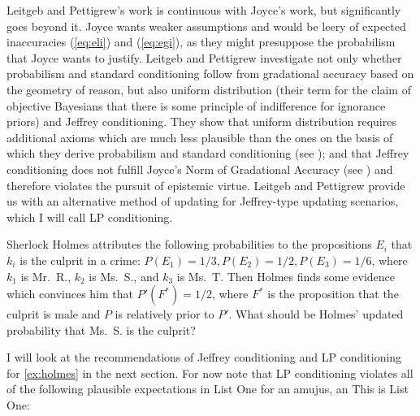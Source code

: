 \documentclass[phd,12pt,oneside]{ubcthesis}
\begin{document}
Leitgeb and Pettigrew's work is continuous with Joyce's work, but
significantly goes beyond it. Joyce wants weaker assumptions and would
be leery of expected inaccuracies (\ref{eq:eli}) and (\ref{eq:egi}),
as they might presuppose the probabilism that Joyce wants to justify.
Leitgeb and Pettigrew investigate not only whether probabilism and
standard conditioning follow from gradational accuracy based on the
geometry of reason, but also uniform distribution (their term for the
claim of objective Bayesians that there is some principle of
indifference for ignorance priors) and Jeffrey conditioning. They show
that uniform distribution requires additional axioms which are much
less plausible than the ones on the basis of which they derive
probabilism and standard conditioning (see
); and that Jeffrey conditioning
does not fulfill Joyce's Norm of Gradational Accuracy (see
) and therefore violates the pursuit of
epistemic virtue. Leitgeb and Pettigrew provide us with an alternative
method of updating for Jeffrey-type updating scenarios, which I will
call LP conditioning.

\begin{quotex}
  \label{ex:holmes} Sherlock Holmes
  attributes the following probabilities to the propositions $E_{i}$
  that $k_{i}$ is the culprit in a crime:
  $P(E_{1})=1/3,P(E_{2})=1/2,P(E_{3})=1/6$, where $k_{1}$ is Mr.\ R.,
  $k_{2}$ is Ms.\ S., and $k_{3}$ is Ms.\ T. Then Holmes finds some
  evidence which convinces him that $P'(F^{*})=1/2$, where $F^{*}$ is
  the proposition that the culprit is male and $P$ is relatively prior
  to $P'$. What should be Holmes' updated probability that Ms.\ S. is
  the culprit?
\end{quotex}

I will look at the recommendations of Jeffrey conditioning and LP
conditioning for {\xample} \ref{ex:holmes} in the next section. For
now note that LP conditioning violates all of the following plausible
expectations in List One\label{page:listone} for an amujus, an
 This is List One:
\end{document}
